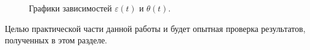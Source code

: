 \documentclass[12pt,a4paper,openany]{extarticle}
\begin{document}
\begin{figure}[h]
	\begin{minipage}[h]{0.44\linewidth}
	\end{minipage}
	\hfill
	\begin{minipage}[h]{0.55\linewidth}
	\end{minipage}
	\caption{Графики зависимостей $\varepsilon(t)$ и $\theta(t)$.}
	\label{graphs}
\end{figure}
	
Целью практической части данной работы и будет опытная проверка результатов, полученных в этом разделе. 


\end{document}
